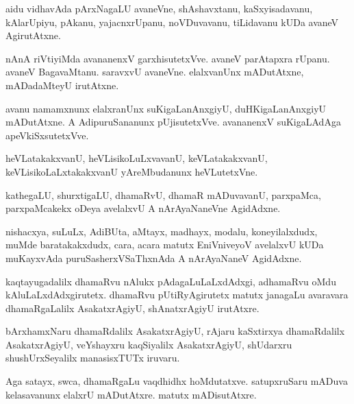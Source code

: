 \begin{mng}
aidu vidhavAda pArxNagaLU avaneVne, shAshavxtanu, kaSxyisadavanu, kAlarUpiyu, pAkanu, yajacnxrUpanu, noVDuvavanu, tiLidavanu kUDa avaneV AgirutAtxne.
\end{mng}

\begin{mng}
nAnA riVtiyiMda avananenxV garxhisutetxVve. avaneV parAtapxra rUpanu. avaneV BagavaMtanu. saravxvU avaneVne. elalxvanUnx mADutAtxne, mADadaMteyU irutAtxne.
\end{mng}

\begin{mng}
avanu namamxnunx elalxranUnx suKigaLanAnxgiyU, duHKigaLanAnxgiyU mADutAtxne. A AdipuruSananunx pUjisutetxVve. avananenxV suKigaLAdAga apeVkiSxsutetxVve.
\end{mng}

\begin{mng}
heVLatakakxvanU, heVLisikoLuLxvavanU, keVLatakakxvanU, keVLisikoLaLxtakakxvanU yAreMbudanunx heVLutetxVne.
\end{mng}

\begin{mng}
kathegaLU, shurxtigaLU, dhamaRvU, dhamaR mADuvavanU, parxpaMca, parxpaMcakekx oDeya avelalxvU A nArAyaNaneVne AgidAdxne.
\end{mng}

\begin{mng}
nishacxya, suLuLx, AdiBUta, aMtayx, madhayx, modalu, koneyilalxdudx, muMde baratakakxdudx, cara, acara matutx EniVniveyoV avelalxvU kUDa muKayxvAda puruSasherxVSaThxnAda A nArAyaNaneV AgidAdxne.
\end{mng}

\begin{mng}
kaqtayugadalilx dhamaRvu nAlukx pAdagaLuLaLxdAdxgi, adhamaRvu oMdu kAluLaLxdAdxgirutetx. dhamaRvu pUtiRyAgirutetx matutx janagaLu avaravara dhamaRgaLalilx AsakatxrAgiyU, shAnatxrAgiyU irutAtxre.
\end{mng}

\begin{mng}
bArxhamxNaru dhamaRdalilx AsakatxrAgiyU, rAjaru kaSxtirxya dhamaRdalilx AsakatxrAgiyU, veYshayxru kaqSiyalilx AsakatxrAgiyU, shUdarxru shushUrxSeyalilx manasisxTUTx iruvaru.
\end{mng}

\begin{mng}
Aga satayx, swca, dhamaRgaLu vaqdhidhx hoMdutatxve. satupxruSaru mADuva kelasavanunx elalxrU mADutAtxre. matutx mADisutAtxre.
\end{mng}

